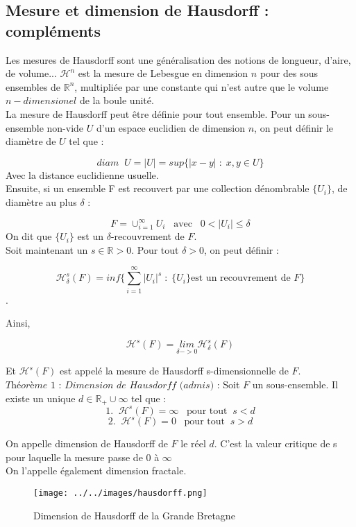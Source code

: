 \subsection{Mesure et dimension de Hausdorff : compléments}
Les mesures de Hausdorff sont une généralisation des notions de longueur, d'aire, de volume... $\mathcal{H}^n$ est la mesure de Lebesgue en dimension $n$ pour des sous ensembles de $\mathbb{R}^n$, multipliée par une constante qui n'est autre que le volume $n-dimensionel$ de la boule unité. \\

La mesure de Hausdorff peut être définie pour tout ensemble. Pour un sous-ensemble non-vide $U$ d'un espace euclidien de dimension $n$, on peut définir le diamètre de $U$ tel que : 

\[ diam \; \; U  =  |U| = sup\{ |x-y| \;  :  \; x,y \in U \}\] 
Avec la distance euclidienne usuelle.\\

Ensuite, si un ensemble F est recouvert par une collection dénombrable $\{U_i\}$, de diamètre au plus $\delta$ : 

\[ F = \cup_{i=1}^{\infty} U_i \; \; \; \text{avec}\; \; \; 0 < |U_i| \leq \delta  \]
 On dit que $\{U_i\}$ est un $\delta$-recouvrement de $F$. \\
 
Soit maintenant un $s \in \mathbb{R} >0 $. Pour tout $\delta >0$, on peut définir : 

\[ \mathcal{H}_{\delta}^s (F) = inf \{ \sum \limits_{i=1}^{\infty} |U_i|^s \; : \; \{U_i\} \text{est un recouvrement de } F\}\].

Ainsi, 

\[ \mathcal{H}^s (F) = \underset{\delta -> 0}{lim} \mathcal{H}_{\delta}^s (F)\] 

Et $\mathcal{H}^s (F)$ est appelé la mesure de Hausdorff s-dimensionnelle de $F$. \\

$\textit{Théorème 1 : Dimension de Hausdorff (admis)}$ : Soit $F$ un sous-ensemble. Il existe un unique  $d \in \mathbb{R}_{+} \cup {\infty}$ tel que : 
\[ 1. \; \; \mathcal{H}^s (F) = \infty \; \; \; \text{pour tout} \; \;  s<d \] 
\[ 2. \; \; \mathcal{H}^s (F) = 0 \; \; \; \text{pour tout} \; \; s>d \] 

On appelle dimension de Hausdorff de $F$ le réel $d$. C'est la valeur critique de s pour laquelle la mesure passe de $0$ à $\infty$ \\

On l'appelle également dimension fractale. 

\begin{figure}[H]
\centering
\texttt{[image: ../../images/hausdorff.png]}
\caption{Dimension de Hausdorff de la Grande Bretagne }
\end{figure}



